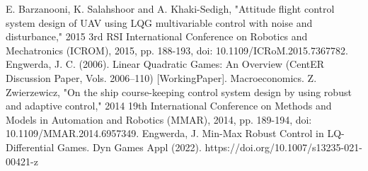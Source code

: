 \documentclass[conference]{IEEEtran}
\begin{document}
\begin{thebibliography}{00}
 E. Barzanooni, K. Salahshoor and A. Khaki-Sedigh, "Attitude flight control system design of UAV using LQG multivariable control with noise and disturbance," 2015 3rd RSI International Conference on Robotics and Mechatronics (ICROM), 2015, pp. 188-193, doi: 10.1109/ICRoM.2015.7367782.
 Engwerda, J. C. (2006). Linear Quadratic Games: An Overview (CentER Discussion Paper, Vols. 2006–110) [WorkingPaper]. Macroeconomics.
 Z. Zwierzewicz, "On the ship course-keeping control system design by using robust and adaptive control," 2014 19th International Conference on Methods and Models in Automation and Robotics (MMAR), 2014, pp. 189-194, doi: 10.1109/MMAR.2014.6957349.
 Engwerda, J. Min-Max Robust Control in LQ-Differential Games. Dyn Games Appl (2022). https://doi.org/10.1007/s13235-021-00421-z



\end{thebibliography}
\end{document}
